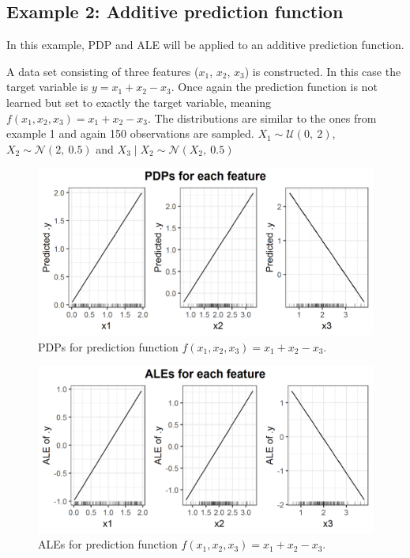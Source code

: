 \documentclass[
]{krantz}
\begin{document}
\hypertarget{example-2-additive-prediction-function}{%
\subsection{Example 2: Additive prediction function}\label{example-2-additive-prediction-function}}

In this example, PDP and ALE will be applied to an additive prediction function.

A data set consisting of three features (\(x_1\), \(x_2\), \(x_3\)) is constructed. In this case the target variable is \(y = x_1 + x_2 - x_3\). Once again the prediction function is not learned but set to exactly the target variable, meaning \(f(x_1, x_2, x_3) = x_1 + x_2 - x_3\).
The distributions are similar to the ones from example 1 and again 150 observations are sampled.
\(X_1 \sim \mathcal{U}(0,~2)\), \(X_2 \sim \mathcal{N}(2,~0.5)\) and \(X_3\mid X_2 \sim \mathcal{N}(X_2,~0.5)\)

\begin{figure}
\includegraphics[width=1\linewidth]{images/ale_1_PDPs_x1_plus_x2_minus_x3_150_0_2_0p5} \caption{PDPs for prediction function \(f(x_1, x_2, x_3) = x_1 + x_2 - x_3\).}\label{fig:pdpsx1px2mx3}
\end{figure}



\begin{figure}
\includegraphics[width=1\linewidth]{images/ale_1_ALEs_x1_plus_x2_minus_x3_150_0_2_0p5} \caption{ALEs for prediction function \(f(x_1, x_2, x_3) = x_1 + x_2 - x_3\).}\label{fig:alesx1px2mx3}
\end{figure}
\end{document}
